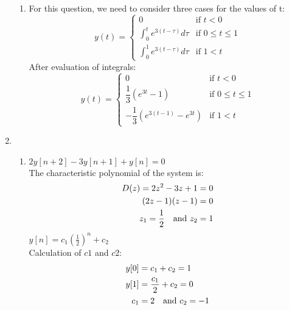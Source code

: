 \documentclass[10pt,a4paper, margin=1in]{article}
\begin{document}
\begin{enumerate}
\begin{enumerate}
    \item %
    For this question, we need to consider three cases for the values of t:
    \begin{equation}
		y(t) = \begin{cases}  
		        0 & \mbox{if } t < 0 \\ 
				\int_{0}^{t} e^{3(t - \tau)} d\tau & \mbox{if } 0 \leq t \leq 1 \\
				\int_{0}^{1} e^{3(t - \tau)} d\tau & \mbox{if } 1 < t \end{cases}
	\end{equation}
	After evaluation of integrals:
	\begin{equation}
		y(t) = \begin{cases}  
		        0 &\mbox{if } t < 0 \\ 
				\dfrac{1}{3}\left( e^{3t} - 1 \right) & \mbox{if } 0 \leq t \leq 1 \\
				- \dfrac{1}{3} \left(e^{3(t-1)}-e^{3t}\right) & \mbox{if } 1 < t \end{cases}
	\end{equation}
    \end{enumerate}

\item %
    \begin{enumerate}
    \item %
    $2y[n+2]-3y[n+1]+y[n]=0$ \\
    The characteristic polynomial of the system is:
    \begin{equation}
        \begin{split}
            D(z)=2z^2-3z+1&=0\\
            (2z-1)(z-1)&=0\\
            z_1= \frac{1}{2} \text{\quad and } z_2 &=1
        \end{split}
    \end{equation}
    $y[n]=c_1\left(\frac{1}{2}\right)^n+c_2$\\
    Calculation of $c1$ and $c2$:
    \begin{equation}
        \begin{split}
            y[0]&=c_1+c_2=1\\
            y[1]&=\frac{c_1}{2}+c_2=0\\
            c_1 &= 2\text{\quad and } c_2 = -1
        \end{split}
    \end{equation}
    

\end{enumerate}
\end{enumerate}
\end{document}
